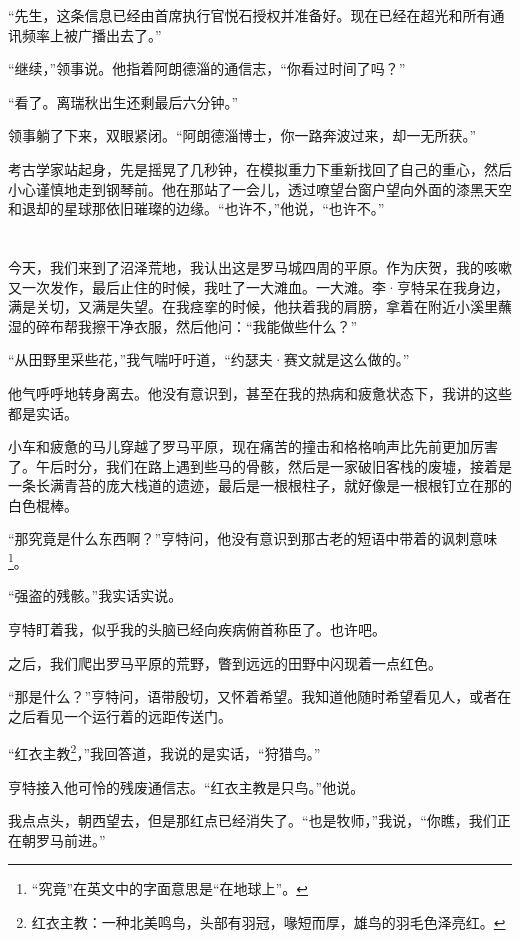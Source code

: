 \documentclass[AutoFakeBold=true]{book}
\begin{document}
``先生，这条信息已经由首席执行官悦石授权并准备好。现在已经在超光和所有通讯频率上被广播出去了。''

``继续，''领事说。他指着阿朗德淄的通信志，``你看过时间了吗？''

``看了。离瑞秋出生还剩最后六分钟。''

领事躺了下来，双眼紧闭。``阿朗德淄博士，你一路奔波过来，却一无所获。''

考古学家站起身，先是摇晃了几秒钟，在模拟重力下重新找回了自己的重心，然后小心谨慎地走到钢琴前。他在那站了一会儿，透过嘹望台窗户望向外面的漆黑天空和退却的星球那依旧璀璨的边缘。``也许不，''他说，``也许不。''

\chapter{}

今天，我们来到了沼泽荒地，我认出这是罗马城四周的平原。作为庆贺，我的咳嗽又一次发作，最后止住的时候，我吐了一大滩血。一大滩。李·亨特呆在我身边，满是关切，又满是失望。在我痉挛的时候，他扶着我的肩膀，拿着在附近小溪里蘸湿的碎布帮我擦干净衣服，然后他问：``我能做些什么？''

``从田野里采些花，''我气喘吁吁道，``约瑟夫·赛文就是这么做的。''

他气呼呼地转身离去。他没有意识到，甚至在我的热病和疲惫状态下，我讲的这些都是实话。

小车和疲惫的马儿穿越了罗马平原，现在痛苦的撞击和格格响声比先前更加厉害了。午后时分，我们在路上遇到些马的骨骸，然后是一家破旧客栈的废墟，接着是一条长满青苔的庞大栈道的遗迹，最后是一根根柱子，就好像是一根根钉立在那的白色棍棒。

``那究竟是什么东西啊？''亨特问，他没有意识到那古老的短语中带着的讽刺意味\footnote{``究竟''在英文中的字面意思是``在地球上''。}。

``强盗的残骸。''我实话实说。

亨特盯着我，似乎我的头脑已经向疾病俯首称臣了。也许吧。

之后，我们爬出罗马平原的荒野，瞥到远远的田野中闪现着一点红色。

``那是什么？''亨特问，语带殷切，又怀着希望。我知道他随时希望看见人，或者在之后看见一个运行着的远距传送门。

``红衣主教\footnote{红衣主教：一种北美鸣鸟，头部有羽冠，喙短而厚，雄鸟的羽毛色泽亮红。}，''我回答道，我说的是实话，``狩猎鸟。''

亨特接入他可怜的残废通信志。``红衣主教是只鸟。''他说。

我点点头，朝西望去，但是那红点已经消失了。``也是牧师，''我说，``你瞧，我们正在朝罗马前进。''
\end{document}
